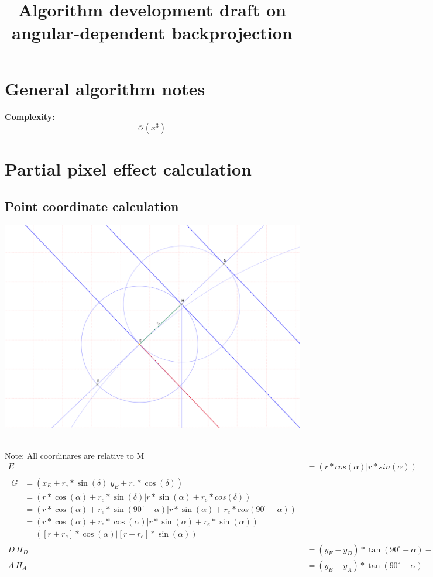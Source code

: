 \documentclass[a4paper,10pt,fleqn]{scrartcl}
\date{}
\title{Algorithm development draft on angular-dependent backprojection}
\numberwithin{equation}{subsection}
\begin{document}
\maketitle\newpage
\section{General algorithm notes}
\textbf{Complexity:}
\begin{equation*}
\mathcal{O}(x^3)
\end{equation*}
\section{Partial pixel effect calculation}
\subsection{Point coordinate calculation}
\begin{minipage}{\textwidth}
\includegraphics[width=\textwidth]{mappicschema}
\end{minipage}\\
\textrm{Note: All coordinares are relative to M}\\
\begin{align}
E &= (r * cos(\alpha) | r * sin(\alpha)) \\
\begin{split}
G &= (x_E + r_e * \sin(\delta) | y_E + r_e * \cos(\delta)) \\
  &= (r * \cos(\alpha) + r_e * \sin(\delta) | r * \sin(\alpha) + r_e * cos(\delta))\\
  &= (r * \cos(\alpha) + r_e * \sin(90^\circ - \alpha) | r * \sin(\alpha) + r_e * cos(90^\circ - \alpha))\\
  &= (r * \cos(\alpha) + r_e * \cos(\alpha) | r * \sin(\alpha) + r_e * \sin(\alpha))\\
  &= ([r + r_e] * \cos(\alpha) | [r + r_e] * \sin(\alpha))
\end{split}\\
\overline{D\,H_D} &= (y_E - y_D) * \tan(90^\circ-\alpha) - x_G - x_D \\
\overline{A\,H_A} &= (y_E - y_A) * \tan(90^\circ-\alpha) - x_G - x_A
\end{align}
\newpage
\end{document}
